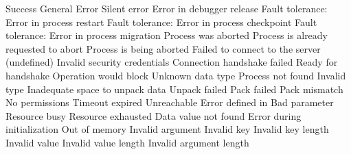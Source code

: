 \begin{constantdesc}
%
Success
%
General Error
%
Silent error
%
Error in debugger release
%
Fault tolerance: Error in process restart
%
Fault tolerance: Error in process checkpoint
%
Fault tolerance: Error in process migration
%
Process was aborted
%
Process is already requested to abort
%
Process is being aborted
%
Failed to connect to the server
%
(undefined)
%
Invalid security credentials
%
Connection handshake failed
%
Ready for handshake
%
Operation would block
%
Unknown data type
%
Process not found
%
Invalid type
%
Inadequate space to unpack data
%
Unpack failed
%
Pack failed
%
Pack mismatch
%
No permissions
%
Timeout expired
%
Unreachable
%
Error defined in 
%
Bad parameter
%
Resource busy
%
Resource exhausted
%
Data value not found
%
Error during initialization
%
Out of memory
%
Invalid argument
%
Invalid key
%
Invalid key length
%
Invalid value
%
Invalid value length
%
Invalid argument length
%

\end{constantdesc}

